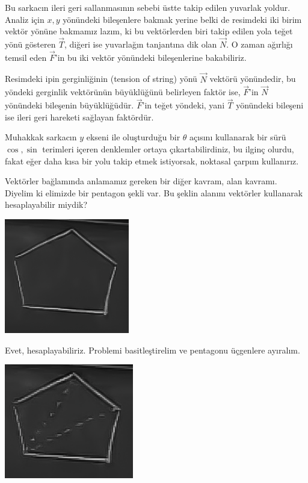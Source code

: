 \documentclass[12pt,fleqn]{article}\usepackage{../../common}
\begin{document}
Bu sarkacın ileri geri sallanmasının sebebi üstte takip edilen yuvarlak
yoldur. Analiz için $x, y$ yönündeki bileşenlere bakmak yerine belki de
resimdeki iki birim vektör yönüne bakmamız lazım, ki bu vektörlerden biri takip
edilen yola teğet yönü gösteren $\vec{T}$, diğeri ise yuvarlağın tanjantına dik
olan $\vec{N}$. O zaman ağırlığı temsil eden $\vec{F}$'in bu iki vektör
yönündeki bileşenlerine bakabiliriz.

Resimdeki ipin gerginliğinin (tension of string) yönü $\vec{N}$ vektörü
yönündedir, bu yöndeki gerginlik vektörünün büyüklüğünü belirleyen faktör ise,
$\vec{F}$'in $\vec{N}$ yönündeki bileşenin büyüklüğüdür. $\vec{F}$'in teğet
yöndeki, yani $\vec{T}$ yönündeki bileşeni ise ileri geri hareketi sağlayan
faktördür.

Muhakkak sarkacın $y$ ekseni ile oluşturduğu bir $\theta$ açısını kullanarak bir
sürü $\cos, \sin$ terimleri içeren denklemler ortaya çıkartabilirdiniz, bu
ilginç olurdu, fakat eğer daha kısa bir yolu takip etmek istiyorsak, noktasal
çarpım kullanırız.

Vektörler bağlamında anlamamız gereken bir diğer kavram, alan kavramı. Diyelim
ki elimizde bir pentagon şekli var. Bu şeklin alanını vektörler kullanarak
hesaplayabilir miydik?

\includegraphics[height=5cm]{2_3.png}

Evet, hesaplayabiliriz. Problemi basitleştirelim ve pentagonu üçgenlere
ayıralım. 

\includegraphics[height=5cm]{2_4.png}
\end{document}
